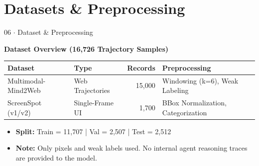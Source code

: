 \documentclass[aspectratio=169, 10pt]{beamer}
\begin{document}

\section{Datasets \& Preprocessing}

\begin{frame}{06 $\cdot$ Dataset \& Preprocessing}

    \textbf{Dataset Overview (16,726 Trajectory Samples)}

    \begin{table}[]
        \centering
        \small

        \begin{tabularx}{\textwidth}{l l r X}

            \toprule
            \textbf{Dataset} &
            \textbf{Type} &
            \textbf{Records} &
            \textbf{Preprocessing} \\

            \midrule

            Multimodal-Mind2Web & Web Trajectories & ~15,000 & Windowing (k=6), Weak Labeling \\

            ScreenSpot (v1/v2) & Single-Frame UI & ~1,700 & BBox Normalization, Categorization \\

            \bottomrule

        \end{tabularx}

    \end{table}

    \vspace{0.2cm}
    \begin{itemize}
        \item \textbf{Split:} Train = 11,707 | Val = 2,507 | Test = 2,512
        \item \textbf{Note:} Only pixels and weak labels used. No internal agent reasoning traces are provided to the model.
    \end{itemize}

\end{frame}

\end{document}
